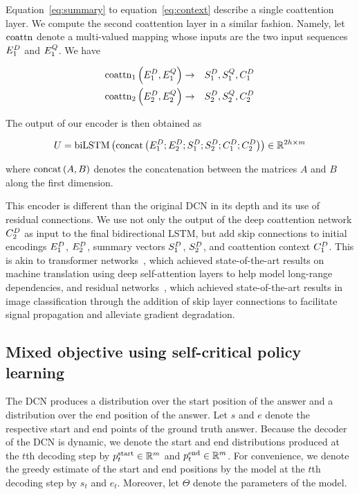 \documentclass{article} %
\begin{document}
Equation~\ref{eq:summary} to equation~\ref{eq:context} describe a single coattention layer.
We compute the second coattention layer in a similar fashion.
Namely, let ${\rm coattn}$ denote a multi-valued mapping whose inputs are the two input sequences $E_1^D$ and $E_1^Q$.
We have

\begin{eqnarray}
{\rm coattn}_1 \left( E_1^D, E_1^Q \right) &\rightarrow& S_1^D, S_1^Q, C_1^D
\\
{\rm coattn}_2 \left( E_2^D, E_2^Q \right) &\rightarrow& S_2^D, S_2^Q, C_2^D
\end{eqnarray}

The output of our encoder is then obtained as

\begin{equation}
U = {\rm biLSTM} \left(
	{\rm concat}\left({
		E_1^D;
		E_2^D;
        S_1^D;
        S_2^D;
        C_1^D;
        C_2^D
    }\right)
\right) \in \mathbb{R}^{2h \times m}
\end{equation}

where ${\rm concat}\left({A, B}\right)$ denotes the concatenation between the matrices $A$ and $B$ along the first dimension.

This encoder is different than the original DCN in its depth and its use of residual connections.
We use not only the output of the deep coattention network $C_2^D$ as input to the final bidirectional LSTM, but add skip connections to initial encodings $E_1^D$, $E_2^D$, summary vectors $S_1^D$, $S_2^D$, and coattention context $C_1^D$.
This is akin to transformer networks~\citep{Vaswani2017AttentionIA}, which achieved state-of-the-art results on machine translation using deep self-attention layers to help model long-range dependencies, and residual networks~\citep{He2016DeepRL}, which achieved state-of-the-art results in image classification through the addition of skip layer connections to facilitate signal propagation and alleviate gradient degradation.


\subsection{Mixed objective using self-critical policy learning}

The DCN produces a distribution over the start position of the answer and a distribution over the end position of the answer.
Let $s$ and $e$ denote the respective start and end points of the ground truth answer.
Because the decoder of the DCN is dynamic, we denote the start and end distributions produced at the $t$th decoding step by $p^{\rm{start}}_t \in \mathbb{R}^{m}$ and $p^{\rm{end}}_t \in \mathbb{R}^{m}$.
For convenience, we denote the greedy estimate of the start and end positions by the model at the $t$th decoding step by $s_t$ and $e_t$.
Moreover, let $\Theta$ denote the parameters of the model.
\end{document}
